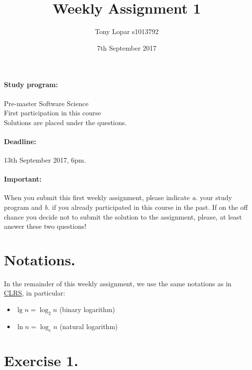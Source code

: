 \documentclass{article}
\begin{document}
\title{Weekly Assignment 1}
\author{Tony Lopar s1013792}
\date{7th September 2017}
\maketitle

\paragraph{Study program:}Pre-master Software Science \\ First participation in this course \\Solutions are placed under the questions.

\paragraph{Deadline:} 13th September 2017, 6pm.

\paragraph{Important:} When you submit this first weekly assignment, please indicate \textit{a.} your study program and \textit{b.} if you already participated in this course in the past. If on the off chance you decide not to submit the solution to the assignment, please, at least answer these two questions!

\section*{Notations.}

\paragraph{}
In the remainder of this weekly assignment, we use the same notations as in \href{https://mitpress.mit.edu/books/introduction-algorithms}{CLRS}, in particular:
\begin{itemize}
	\item $\lg n = \log_2 n$ (binary logarithm)
	\item $\ln n = \log_e n$ (natural logarithm)
\end{itemize}




\section*{Exercise 1.}
\end{document}
